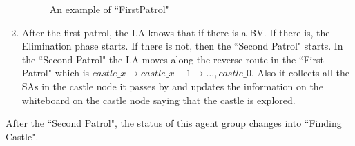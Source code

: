 \begin{enumerate}
\begin{figure} [H]
    \hspace{1in} 
      \hspace{1in} 
  \caption{An example of  ``FirstPatrol" } 
  \label{fig:FirstPatrol} %
\end{figure}


\item 
After the first patrol, the LA knows that if there is a BV. If there is, the Elimination phase starts. If there is not, then the ``Second Patrol" starts. In the ``Second Patrol" the LA moves along the reverse route in the ``First Patrol" which is $castle\_x\rightarrow castle\_{x-1} \rightarrow\ldots, castle\_0$. Also it collects all the SAs in the castle node it passes by and updates the information on the whiteboard on the castle node saying that the castle is explored. 
\end{enumerate}  
After the ``Second Patrol", the status of this agent group changes into ``Finding Castle". 


